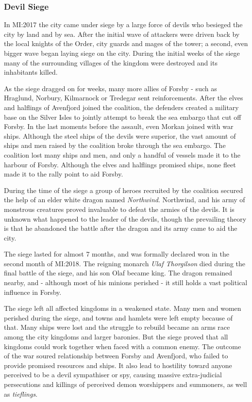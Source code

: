 \subsubsection{Devil Siege}
\label{sec:Devil Siege}


In MI:2017 the city came under siege by a large force of devils who besieged
the city by land and by sea. After the initial wave of attackers were driven
back by the local knights of the Order, city guards and mages of the tower; a
second, even bigger wave began laying siege on the city. During the initial
weeks of the siege many of the surrounding villages of the kingdom were
destroyed and its inhabitants killed.

As the siege dragged on for weeks, many more allies of Forsby - such as
Hraglund, Norbury, Kilmarnock or Tredegar sent reinforcements. After the elves
and halflings of Avenfjord joined the coalition, the defenders created a
military base on the Silver Isles to jointly attempt to break the sea embargo
that cut off Forsby. In the last moments before the assault, even Morkan
joined with war ships. Although the steel ships of the devils were superior,
the vast amount of ships and men raised by the coalition broke through the sea
embargo. The coalition lost many ships and men, and only a handful of vessels
made it to the harbour of Forsby. Although the elves and halflings promised
ships, none fleet made it to the rally point to aid Forsby.

During the time of the siege a group of heroes recruited by the coalition
secured the help of an elder white dragon named \emph{Northwind}. Northwind,
and his army of monstrous creatures proved invaluable to defeat the armies of
the devils. It is unknown what happened to the leader of the devils, though
the prevailing theory is that he abandoned the battle after the dragon and its
army came to aid the city.

The siege lasted for almost 7 months, and was formally declared won in the
second month of MI:2018. The reigning monarch \emph{Ulaf Thorgilson} died
during the final battle of the siege, and his son Olaf became king. The dragon
remained nearby, and - although most of his minions perished - it still holds
a vast political influence in Forsby.

The siege left all affected kingdoms in a weakened state. Many men and women
perished during the siege, and towns and hamlets were left empty because of
that. Many ships were lost and the struggle to rebuild became an arms race
among the city kingdoms and larger baronies. But the siege proved that all
kingdoms could work together when faced with a common enemy. The outcome of
the war soured relationship between Forsby and Avenfjord, who failed to
provide promised resources and ships. It also lead to hostility toward anyone
perceived to be a devil sympathiser or spy, causing massive extra-judicial
persecutions and killings of perceived demon worshippers and summoners, as
well as \emph{tieflings}.

